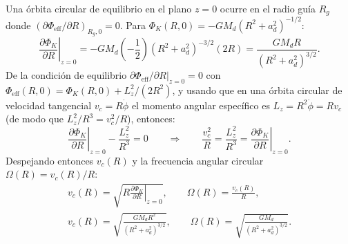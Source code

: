 \documentclass[11pt,letterpaper]{article}
\begin{document}
Una órbita circular de equilibrio en el plano $z = 0$ ocurre en el radio guía $R_g$ donde $(\partial\Phi_{\mathrm{eff}}/\partial R)_{R_g,0} = 0$. Para $\Phi_K(R, 0) = -GM_d (R^2 + a_d^2)^{-1/2}$:
\begin{equation}
    \left.\frac{\partial \Phi_K}{\partial R}\right|_{z=0}
    = -GM_d\left(-\frac{1}{2}\right)(R^2 + a_d^2)^{-3/2}(2R)
    = \frac{GM_d R}{(R^2 + a_d^2)^{3/2}}.
\end{equation}
De la condición de equilibrio $\left.\partial\Phi_{\mathrm{eff}}/\partial R\right|_{z=0} = 0$ con $\Phi_{\mathrm{eff}}(R, 0) = \Phi_K(R, 0) + L_z^2/(2R^2)$, y usando que en una órbita circular de velocidad tangencial $v_c = R\dot{\phi}$ el momento angular específico es $L_z = R^2\dot{\phi} = R v_c$ (de modo que $L_z^2/R^3 = v_c^2/R$), entonces:
\begin{equation}
    \left.\frac{\partial \Phi_K}{\partial R}\right|_{z=0} - \frac{L_z^2}{R^3} = 0
    \qquad \Longrightarrow \qquad
    \frac{v_c^2}{R} = \frac{L_z^2}{R^3} = \left.\frac{\partial \Phi_K}{\partial R}\right|_{z=0}.
\end{equation}
Despejando entonces $v_c(R)$ y la frecuencia angular circular $\Omega(R) = v_c(R)/R$:
\begin{gather}
    v_c(R) = \sqrt{R\left.\frac{\partial \Phi_K}{\partial R}\right|_{z=0}},
    \qquad
    \Omega(R) = \frac{v_c(R)}{R}, \nonumber \\[4pt]
    \boxed{v_c(R) = \sqrt{\frac{G M_d R^2}{(R^2 + a_d^2)^{3/2}}}}, \qquad
    \boxed{\Omega(R) = \sqrt{\frac{G M_d}{(R^2 + a_d^2)^{3/2}}}}.
    \label{eq:vc_omega}
\end{gather}
\end{document}
